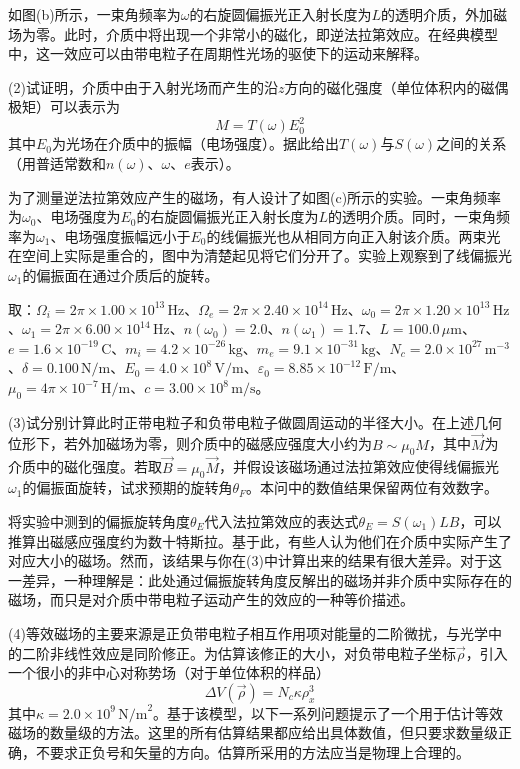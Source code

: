 \documentclass[11pt,a4paper,onecolumn,UTF8]{ctexart}
\begin{document}
	如图(b)所示，一束角频率为$\omega$的右旋圆偏振光正入射长度为$L$的透明介质，外加磁场为零。此时，介质中将出现一个非常小的磁化，即逆法拉第效应。在经典模型中，这一效应可以由带电粒子在周期性光场的驱使下的运动来解释。
	
	(2)试证明，介质中由于入射光场而产生的沿$z$方向的磁化强度（单位体积内的磁偶极矩）可以表示为
	\begin{equation*}
		M=T(\omega)E_0^2
	\end{equation*}
	其中$E_0$为光场在介质中的振幅（电场强度）。据此给出$T(\omega)$与$S(\omega)$之间的关系（用普适常数和$n(\omega)$、$\omega$、$e$表示）。
	
	为了测量逆法拉第效应产生的磁场，有人设计了如图(c)所示的实验。一束角频率为$\omega_0$、电场强度为$E_0$的右旋圆偏振光正入射长度为$L$的透明介质。同时，一束角频率为$\omega_1$、电场强度振幅远小于$E_0$的线偏振光也从相同方向正入射该介质。两束光在空间上实际是重合的，图中为清楚起见将它们分开了。实验上观察到了线偏振光$\omega_1$的偏振面在通过介质后的旋转。
	
	取：$\Omega_i=2\pi\times1.00\times10^{13}\,\text{Hz}$、$\Omega_e=2\pi\times2.40\times10^{14}\,\text{Hz}$、$\omega_0=2\pi\times1.20\times10^{13}\,\text{Hz}$、$\omega_1=2\pi\times6.00\times10^{14}\,\text{Hz}$、$n(\omega_0)=2.0$、$n(\omega_1)=1.7$、$L=100.0\,\mu\text{m}$、$e=1.6\times10^{-19}\,\text{C}$、$m_i=4.2\times10^{-26}\,\text{kg}$、$m_e=9.1\times10^{-31}\,\text{kg}$、$N_c=2.0\times10^{27}\,\text{m}^{-3}$、$\delta=0.100\,\text{N/m}$、$E_0=4.0\times10^8\,\text{V/m}$、$\varepsilon_{0}=8.85\times10^{-12}\,\text{F/m}$、$\mu_0=4\pi\times10^{-7}\,\text{H/m}$、$c=3.00\times10^8\,\text{m/s}$。
	
	(3)试分别计算此时正带电粒子和负带电粒子做圆周运动的半径大小。在上述几何位形下，若外加磁场为零，则介质中的磁感应强度大小约为$B\sim\mu_0M$，其中$\vec M$为介质中的磁化强度。若取$\vec B=\mu_0\vec M$，并假设该磁场通过法拉第效应使得线偏振光$\omega_1$的偏振面旋转，试求预期的旋转角$\theta_F$。本问中的数值结果保留两位有效数字。
	
	将实验中测到的偏振旋转角度$\theta_E$代入法拉第效应的表达式$\theta_E=S(\omega_1)LB$，可以推算出磁感应强度约为数十特斯拉。基于此，有些人认为他们在介质中实际产生了对应大小的磁场。然而，该结果与你在(3)中计算出来的结果有很大差异。对于这一差异，一种理解是：此处通过偏振旋转角度反解出的磁场并非介质中实际存在的磁场，而只是对介质中带电粒子运动产生的效应的一种等价描述。
	
	(4)等效磁场的主要来源是正负带电粒子相互作用项对能量的二阶微扰，与光学中的二阶非线性效应是同阶修正。为估算该修正的大小，对负带电粒子坐标$\vec\rho$，引入一个很小的非中心对称势场（对于单位体积的样品）
	\begin{equation*}
		\Delta V(\vec\rho)=N_c\kappa\rho_x^3
	\end{equation*}
	其中$\kappa=2.0\times10^9\,\text{N/m}^2$。基于该模型，以下一系列问题提示了一个用于估计等效磁场的数量级的方法。这里的所有估算结果都应给出具体数值，但只要求数量级正确，不要求正负号和矢量的方向。估算所采用的方法应当是物理上合理的。
	
\end{document}
